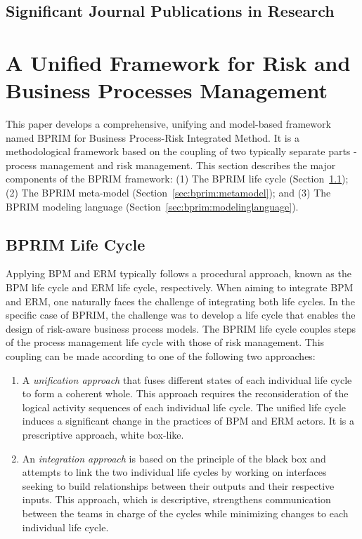 \documentclass[preprint,3p,times,number]{elsarticle}
\begin{document}
\subsection{Significant Journal Publications in Research}



\section{A Unified Framework for Risk and Business Processes Management}
\label{sec:bprim}
This paper develops a comprehensive, unifying and model-based framework named BPRIM for Business Process-Risk Integrated Method. It is a methodological framework based on the coupling of two typically separate parts - process management and risk management. This section describes the major components of the BPRIM framework: (1) The BPRIM life cycle (Section~\ref{sec:bprim:lifecycle}); (2) The BPRIM meta-model (Section~\ref{sec:bprim:metamodel}); and (3) The BPRIM modeling language (Section~\ref{sec:bprim:modelinglanguage}).

\subsection{BPRIM Life Cycle}
\label{sec:bprim:lifecycle} 
Applying BPM and ERM typically follows a procedural approach, known as the BPM life cycle and ERM life cycle, respectively. When aiming to integrate BPM and ERM, one naturally faces the challenge of integrating both life cycles. In the specific case of BPRIM, the challenge was to develop a life cycle that enables the design of risk-aware business process models. The BPRIM life cycle couples steps of the process management life cycle with those of risk management. This coupling can be made according to one of the following two approaches:
\begin{enumerate}
    \item A \emph{unification approach} that fuses different states of each individual life cycle to form a coherent whole. This approach requires the reconsideration of the logical activity sequences of each individual life cycle. The unified life cycle induces a significant change in the practices of BPM and ERM actors. It is a prescriptive approach, white box-like.
    \item An \emph{integration approach} is based on the principle of the black box and attempts to link the two individual life cycles by working on interfaces seeking to build relationships between their outputs and their respective inputs. This approach, which is descriptive, strengthens communication between the teams in charge of the cycles while minimizing changes to each individual life cycle. 
\end{enumerate}
\end{document}
